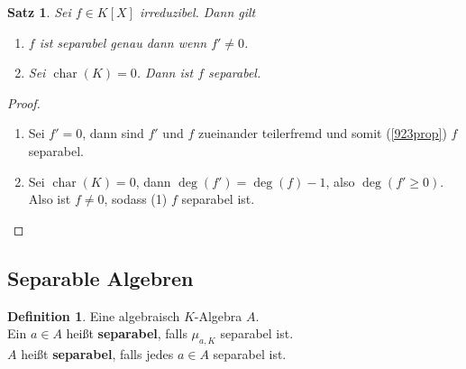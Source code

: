 \documentclass[10pt,a4paper]{article}
\newcommand{\cha}{\ensuremath{\operatorname{char}}}
\newcounter{thm}[section]
\theoremstyle{definition}
\newtheorem{definition}[thm]{Definition}
\theoremstyle{plain}
\newtheorem{satz}[thm]{Satz}
\theoremstyle{remark}
\begin{document}
\begin{satz}\label{924satz}
	Sei $f\in K[X]$ irreduzibel. Dann gilt
	\begin{enumerate}
		\item $f$ ist separabel genau dann wenn $f'\neq 0$.
		\item Sei $\cha(K)=0$. Dann ist $f$ separabel.
	\end{enumerate}
\end{satz}
\begin{proof}
	\begin{enumerate}
		\item Sei $f'=0$, dann sind $f'$ und $f$ zueinander teilerfremd und somit (\ref{923prop}) $f$ separabel.
		\item Sei $\cha(K)=0$, dann $\deg(f')=\deg(f)-1$, also $\deg(f'\geq 0)$.\\
		Also ist $f\neq 0$, sodass (1) $f$ separabel ist.
	\end{enumerate}
\end{proof}



\subsection{Separable Algebren}

\begin{definition}
	Eine algebraisch $K$-Algebra $A$.\\
	Ein $a\in A$ heißt \textbf{separabel}, falls $\mu_{a,K}$ separabel ist.\\
	$A$ heißt \textbf{separabel}, falls jedes $a\in A$ separabel ist.
\end{definition}
\end{document}
